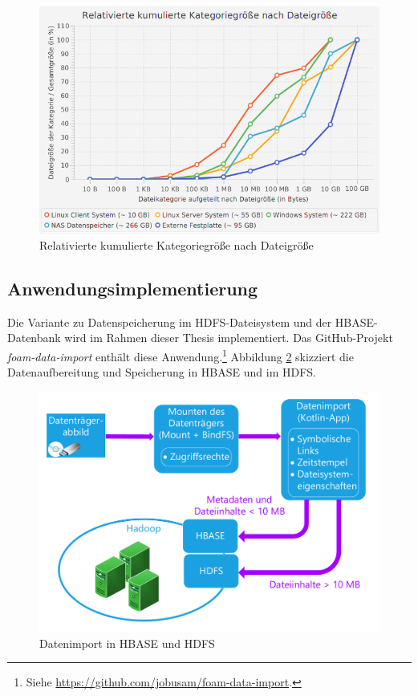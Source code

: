  \begin{figure}[ht]
  \centering
  \includegraphics[width=\textwidth]{./resource/fileSize_relativeCumulatedCategorieSize.png}
  \caption{Relativierte kumulierte Kategoriegröße nach Dateigröße}
  \label{fig:file_size_r_c_file_size}
\end{figure}

\subsection{Anwendungsimplementierung} 
\label{subsec:data_import_implementation}

Die Variante zu Datenspeicherung im HDFS-Dateisystem und der HBASE-Datenbank wird im Rahmen dieser Thesis implementiert. Das GitHub-Projekt \textit{foam-data-import} enthält diese Anwendung.\footnote{Siehe \url{https://github.com/jobusam/foam-data-import}.} Abbildung \ref{fig:data_import} skizziert die Datenaufbereitung und Speicherung in HBASE und im HDFS.\\
\begin{figure}[ht]
  \centering
  \includegraphics[width=\textwidth]{./resource/storage_hdfs_and_hbase.pdf}
  \caption{Datenimport in HBASE und HDFS}
  \label{fig:data_import}
\end{figure}

